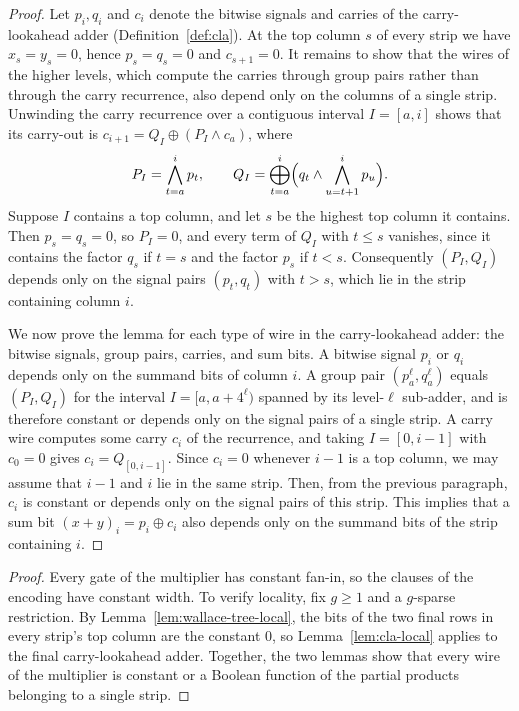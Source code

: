 \documentclass[11pt]{article}
\theoremstyle{definition}
\theoremstyle{remark}
\begin{document}
\begin{proof}
Let $p_i,q_i$ and $c_i$ denote the bitwise signals and carries of the carry-lookahead adder (Definition~\ref{def:cla}). At the top column $s$ of every strip we have
$x_s=y_s=0$, hence $p_s=q_s=0$ and $c_{s+1}=0$. It remains to show that the wires of the higher levels, which compute the
carries through group pairs rather than through the carry recurrence, also depend only on the columns of a single strip. Unwinding
the carry recurrence over a contiguous interval $I=[a,i]$ shows that its carry-out is $c_{i+1}=Q_I\oplus(P_I\wedge c_a)$, where
\[
P_I=\bigwedge_{t=a}^i p_t,
\qquad
Q_I=\bigoplus_{t=a}^i \Bigl(q_t\wedge\bigwedge_{u=t+1}^i p_u\Bigr).
\]
Suppose $I$ contains a top column, and let $s$ be the highest top column it contains. Then $p_s=q_s=0$, so $P_I=0$, and every term
of $Q_I$ with $t\le s$ vanishes, since it contains the factor $q_s$ if $t=s$ and the factor $p_s$ if $t<s$. Consequently
$(P_I,Q_I)$ depends only on the signal pairs $(p_t,q_t)$ with $t>s$, which lie in the strip containing column $i$.

We now prove the lemma for each type of wire in the carry-lookahead adder: the bitwise signals, group pairs, carries, and sum
bits. A bitwise signal $p_i$ or $q_i$ depends only on the summand bits of column $i$. A group pair $(p^\ell_a,q^\ell_a)$ equals
$(P_I,Q_I)$ for the interval $I=[a,a+4^\ell)$ spanned by its level-$\ell$ sub-adder, and is therefore constant or depends only on
the signal pairs of a single strip. A carry wire computes some carry $c_i$ of the recurrence, and taking $I=[0,i-1]$ with $c_0=0$
gives $c_i=Q_{[0,i-1]}$. Since $c_i=0$ whenever $i-1$ is a top column, we may assume that $i-1$ and $i$ lie in the same strip. Then, from the previous paragraph, $c_i$ is constant or depends only on the signal pairs of this strip. This implies that a sum bit
$(x+y)_i=p_i\oplus c_i$ also depends only on the summand bits of the strip containing $i$.
\end{proof}

\wallacestriplocal*

\begin{proof}
Every gate of the multiplier has constant fan-in, so the clauses of the encoding have constant width. To verify locality, fix
$g\ge1$ and a $g$-sparse restriction. By Lemma~\ref{lem:wallace-tree-local}, the bits of the two final rows in every strip's top
column are the constant $0$, so Lemma~\ref{lem:cla-local} applies to the final carry-lookahead adder. Together, the two lemmas show
that every wire of the multiplier is constant or a Boolean function of the partial products belonging to a single strip.
\end{proof}
\end{document}
